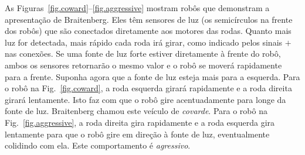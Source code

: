As Figuras~\ref{fig.coward}--\ref{fig.aggressive} mostram robôs que demonstram a apresentação de Braitenberg. Eles têm sensores de luz (os semicírculos na frente dos robôs) que são conectados diretamente aos motores das rodas. Quanto mais luz for detectada, mais rápido cada roda irá girar, como indicado pelos sinais $+$ nas conexões. Se uma fonte de luz forte estiver diretamente à frente do robô, ambos os sensores retornarão o mesmo valor e o robô se moverá rapidamente para a frente. Suponha agora que a fonte de luz esteja mais para a esquerda. Para o robô na Fig.~\ref{fig.coward}, a roda esquerda girará rapidamente e a roda direita girará lentamente. Isto faz com que o robô gire acentuadamente para longe da fonte de luz. Braitenberg chamou este veículo de \emph{covarde}. Para o robô na Fig.~\ref{fig.aggressive}, a roda direita gira rapidamente e a roda esquerda gira lentamente para que o robô gire em direção à fonte de luz, eventualmente colidindo com ela. Este comportamento é \emph{agressivo}.

